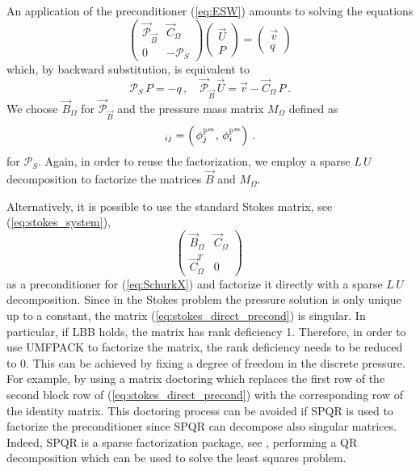 An application of the preconditioner (\ref{eq:ESW}) amounts to solving the
equations
\begin{equation*}
\begin{pmatrix}
\vec{\mathcal{P}}_{\vec B} & \vec C_\Omega \\
0 & -\mathcal{P}_S
\end{pmatrix}
\begin{pmatrix} \vec U \\ P \end{pmatrix}
= \begin{pmatrix} \vec v \\ q \end{pmatrix}
\end{equation*}
which, by backward substitution, is equivalent to
\begin{equation}\label{eq:blocksolution}
\mathcal{P}_S\,P = -q\,,\quad \vec{\mathcal{P}}_{\vec B}\,\vec U = \vec v -
\vec C_\Omega\,P\,.
\end{equation}
We choose $\vec B_\Omega$  for $\vec{\mathcal{P}}_{\vec B}$ and the pressure
mass matrix $M_\Omega$ defined as
\begin{equation*}
[M_\Omega]_{ij} = \left(\,\phi_j^{\pspace^m},\, \phi_i^{\pspace^m}\right)\,.
\end{equation*}
for $\mathcal{P}_S$. Again, in order to reuse the factorization, we employ a
sparse $L\,U$ decomposition to factorize the matrices $\vec B$ and $M_\Omega$.

Alternatively, it is possible to use the standard Stokes matrix, see
(\ref{eq:stokes_system}),
\begin{equation}\label{eq:stokes_direct_precond}
\begin{pmatrix}
\vec B_\Omega & \vec C_\Omega \\
\vec C_\Omega^T & 0
\end{pmatrix}\,
\end{equation}
as a preconditioner for (\ref{eq:SchurkX}) and factorize it directly with a
sparse $L\,U$ decomposition. Since in the Stokes problem the pressure
solution is only unique up to a constant, the matrix
(\ref{eq:stokes_direct_precond}) is singular. In particular, if LBB holds, the
matrix has rank deficiency 1. Therefore, in order to use UMFPACK to factorize
the matrix, the rank deficiency needs to be reduced to 0. This can be achieved
by fixing a degree of freedom in the discrete pressure. For example, by
using a matrix doctoring which replaces the first row of the second block row
of (\ref{eq:stokes_direct_precond}) with the corresponding row of the identity
matrix. This doctoring
process can be avoided if SPQR is used to factorize the preconditioner since
SPQR can decompose also singular matrices. Indeed, SPQR is a sparse
factorization package, see \cite{Davis11}, performing a QR decomposition which
can be used to solve the least squares problem.

